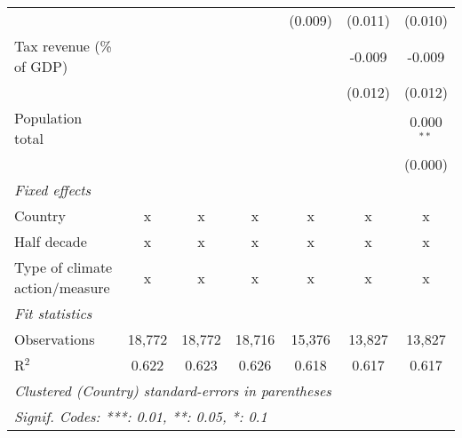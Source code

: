 \begin{tabular}{lcccccc}
                                                       &         &              &               & (0.009)        & (0.011)        & (0.010)\\   
   Tax revenue (\% of GDP)                             &         &              &               &                & -0.009         & -0.009\\   
                                                       &         &              &               &                & (0.012)        & (0.012)\\   
   Population total                                    &         &              &               &                &                & 0.000$^{**}$\\   
                                                       &         &              &               &                &                & (0.000)\\   
   \emph{Fixed effects}\\
   Country                                             & x       & x            & x             & x              & x              & x\\  
   Half decade                                         & x       & x            & x             & x              & x              & x\\  
   Type of climate action/measure                      & x       & x            & x             & x              & x              & x\\  
   \midrule \emph{Fit statistics}\\
   Observations                                        & 18,772  & 18,772       & 18,716        & 15,376         & 13,827         & 13,827\\  
   R$^2$                                               & 0.622   & 0.623        & 0.626         & 0.618          & 0.617          & 0.617\\  
   \midrule
   \multicolumn{7}{l}{\emph{Clustered (Country) standard-errors in parentheses}}\\
   \multicolumn{7}{l}{\emph{Signif. Codes: ***: 0.01, **: 0.05, *: 0.1}}\\
\end{tabular}
\par\endgroup


